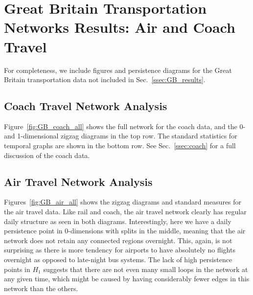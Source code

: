 %
%
%
%
%
\section{Great Britain Transportation Networks Results: Air and Coach Travel} 
\label{app:air_and_coach}

For completeness, we include figures and persistence diagrams for the Great Britain transportation data not included in Sec.~\ref{ssec:GB_results}. 

\subsection{Coach Travel Network Analysis}
Figure~\ref{fig:GB_coach_all} shows the full network for the coach data, and the 0- and 1-dimensional zigzag diagrams in the top row. 
The standard statistics for temporal graphs are shown in the bottom row. 
See Sec.~\ref{ssec:coach} for a full discussion of the coach data. 
%


%
\subsection{Air Travel Network Analysis}
Figures~\ref{fig:GB_air_all} shows the zigzag diagrams and standard measures for the air travel data. 
Like rail and coach, the air travel network clearly has regular daily structure as seen in both diagrams. 
Interestingly, here we have a daily persistence point in 0-dimensions with splits in the middle, meaning that the air network does not retain any connected regions overnight. 
This, again, is not surprising as there is more tendency for airports to have absolutely no flights overnight as opposed to late-night bus systems. 
The lack of high persistence points in $H_1$ suggests that there are not even many small loops in the network at any given time, which might be caused by having considerably fewer edges in this network than the others. 


